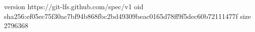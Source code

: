 version https://git-lfs.github.com/spec/v1
oid sha256:ef05ec75f30ac7bf94b868fbc2bd49309beac0165d78ff9f5dec60b72111477f
size 2796368
